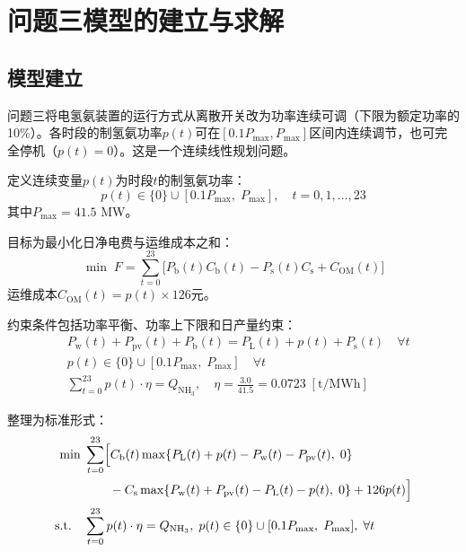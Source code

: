 \section{问题三模型的建立与求解}

\subsection{模型建立}

问题三将电氢氨装置的运行方式从离散开关改为功率连续可调（下限为额定功率的10\%）。各时段的制氢氨功率$p(t)$可在$[0.1P_{\mathrm{max}}, P_{\mathrm{max}}]$区间内连续调节，也可完全停机（$p(t)=0$）。这是一个连续线性规划问题。

定义连续变量$p(t)$为时段$t$的制氢氨功率：
\begin{equation}
p(t) \in \{0\} \cup [0.1P_{\mathrm{max}},\; P_{\mathrm{max}}], \quad t = 0,1,\ldots,23 \label{eq:q3_var}
\end{equation}
其中$P_{\mathrm{max}} = 41.5$ MW。

目标为最小化日净电费与运维成本之和：
\begin{equation}
\min \; F = \sum_{t=0}^{23} \bigl[ P_{\mathrm{b}}(t)C_{\mathrm{b}}(t) - P_{\mathrm{s}}(t)C_{\mathrm{s}} + C_{\mathrm{OM}}(t) \bigr] \label{eq:q3_obj}
\end{equation}
运维成本$C_{\mathrm{OM}}(t) = p(t) \times 126$元。

约束条件包括功率平衡、功率上下限和日产量约束：
\begin{align}
&P_{\mathrm{w}}(t) + P_{\mathrm{pv}}(t) + P_{\mathrm{b}}(t) = P_{\mathrm{L}}(t) + p(t) + P_{\mathrm{s}}(t) \quad \forall t \label{eq:q3_bal} \\
&p(t) \in \{0\} \cup [0.1P_{\mathrm{max}},\; P_{\mathrm{max}}] \quad \forall t \label{eq:q3_plim} \\
&\sum_{t=0}^{23} p(t) \cdot \eta = Q_{\mathrm{NH_3}}, \quad \eta = \frac{3.0}{41.5} = 0.0723 \; [\text{t/MWh}] \label{eq:q3_q}
\end{align}

整理为标准形式：
\begin{align}
\min \; & \sum_{t=0}^{23} \Bigl[ C_{\mathrm{b}}(t)\max\{P_{\mathrm{L}}(t) + p(t) - P_{\mathrm{w}}(t) - P_{\mathrm{pv}}(t),\; 0\} \notag \\
&\qquad - C_{\mathrm{s}}\max\{P_{\mathrm{w}}(t) + P_{\mathrm{pv}}(t) - P_{\mathrm{L}}(t) - p(t),\; 0\} + 126p(t) \Bigr] \label{eq:q3_model} \\
\text{s.t.} \quad & \sum_{t=0}^{23} p(t) \cdot \eta = Q_{\mathrm{NH_3}},\; p(t) \in \{0\} \cup [0.1P_{\mathrm{max}},\; P_{\mathrm{max}}],\; \forall t \notag
\end{align}

